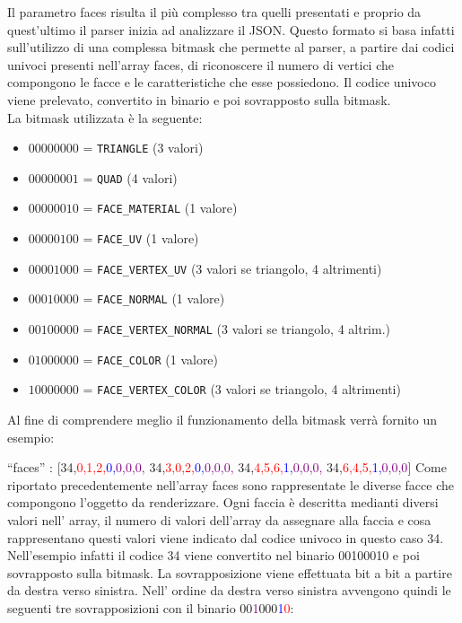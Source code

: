 Il parametro faces risulta il più complesso tra quelli presentati e proprio da quest’ultimo il parser inizia ad analizzare il JSON.
Questo formato si basa infatti sull’utilizzo di una complessa bitmask che permette al parser, a partire dai codici univoci presenti nell’array faces, di riconoscere il numero di vertici che compongono le facce e le caratteristiche che esse possiedono. 
Il codice univoco viene prelevato, convertito in  binario e poi sovrapposto sulla bitmask.
\\
La bitmask utilizzata è la seguente:
\begin{itemize}
\item $00 00 00 00$ = \texttt{TRIANGLE} (3 valori)
\item $00 00 00 01$ = \texttt{QUAD} (4 valori)
\item $00 00 00 10$ = \texttt{FACE\_MATERIAL} (1 valore)
\item $00 00 01 00$ = \texttt{FACE\_UV} (1 valore)
\item $00 00 10 00$ = \texttt{FACE\_VERTEX\_UV} (3 valori se triangolo, 4 altrimenti)
\item $00 01 00 00$ = \texttt{FACE\_NORMAL} (1 valore)
\item $00 10 00 00$ = \texttt{FACE\_VERTEX\_NORMAL} (3 valori se triangolo, 4 altrim.)
\item $01 00 00 00$ = \texttt{FACE\_COLOR} (1 valore)
\item $10 00 00 00$ = \texttt{FACE\_VERTEX\_COLOR} (3 valori se triangolo, 4 altrimenti)
\end{itemize}
Al fine di comprendere meglio il funzionamento della bitmask verrà fornito un esempio:

``faces'' : [34,\textcolor{red}{0,1,2,}\textcolor{blue}{0,}\textcolor{purple}{0,0,0,}    34,\textcolor{red}{3,0,2,}\textcolor{blue}{0,}\textcolor{purple}{0,0,0,}    34,\textcolor{red}{4,5,6,}\textcolor{blue}{1,}\textcolor{purple}{0,0,0,}   34,\textcolor{red}{6,4,5,}\textcolor{blue}{1,}\textcolor{purple}{0,0,0}]
Come riportato precedentemente nell’array faces sono rappresentate le diverse facce che compongono l’oggetto da renderizzare. 
Ogni faccia è descritta medianti diversi valori nell’ array, il numero di valori dell’array da assegnare alla faccia e cosa rappresentano questi valori viene indicato dal codice univoco in questo caso 34.
\\
Nell’esempio infatti il codice 34 viene convertito nel binario 00100010 e poi sovrapposto sulla bitmask. La sovrapposizione viene effettuata bit a bit a partire da destra verso sinistra.
Nell’ ordine da destra verso sinistra avvengono quindi le seguenti tre sovrapposizioni con il binario 00\textcolor{purple}{1}000\textcolor{blue}{1}\textcolor{red}{0}:

